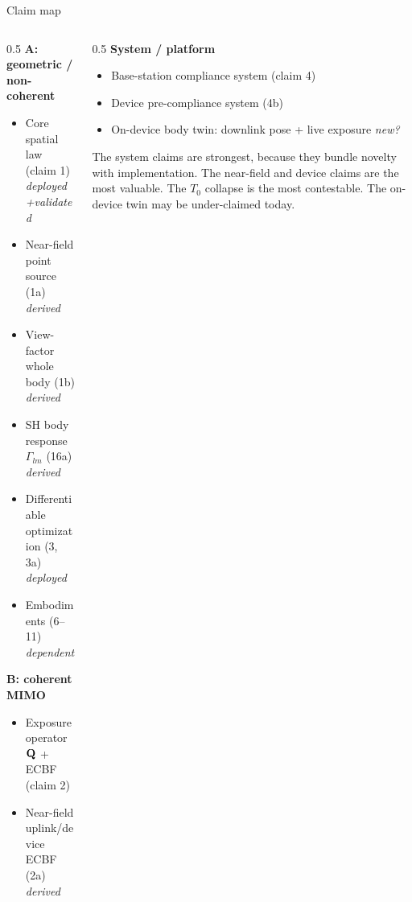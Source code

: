 \documentclass[aspectratio=169, 10pt]{beamer}
\begin{document}
\begin{frame}[t]{Claim map}
  \begin{columns}[T]
    \begin{column}{0.5\textwidth}\footnotesize
      \textbf{A: geometric / non-coherent}
      \begin{itemize}\setlength\itemsep{1pt}
        \item Core spatial law (claim 1) \hfill\textit{deployed+validated}
        \item Near-field point source (1a) \hfill\textit{derived}
        \item View-factor whole body (1b) \hfill\textit{derived}
        \item SH body response $\Gamma_{lm}$ (16a) \hfill\textit{derived}
        \item Differentiable optimization (3, 3a) \hfill\textit{deployed}
        \item Embodiments (6--11) \hfill\textit{dependent}
      \end{itemize}
      \textbf{B: coherent MIMO}
      \begin{itemize}\setlength\itemsep{1pt}
        \item Exposure operator $\mathbf{Q}$ + ECBF (claim 2)
        \item Near-field uplink/device ECBF (2a) \hfill\textit{derived}
      \end{itemize}
    \end{column}
    \begin{column}{0.5\textwidth}\footnotesize
      \textbf{System / platform}
      \begin{itemize}\setlength\itemsep{1pt}
        \item Base-station compliance system (claim 4)
        \item Device pre-compliance system (4b)
        \item On-device body twin: downlink pose + live exposure \hfill\textit{new?}
      \end{itemize}
      \vspace{6pt}
      \begin{tcolorbox}[colback=lightblue,colframe=navyblue,arc=2pt,boxrule=0.6pt,left=5pt,right=5pt,top=3pt,bottom=3pt]
        {\footnotesize The system claims are strongest, because they bundle novelty with implementation. The near-field and device claims are the most valuable. The $T_0$ collapse is the most contestable. The on-device twin may be under-claimed today.}
      \end{tcolorbox}
    \end{column}
  \end{columns}
\end{frame}
\end{document}
